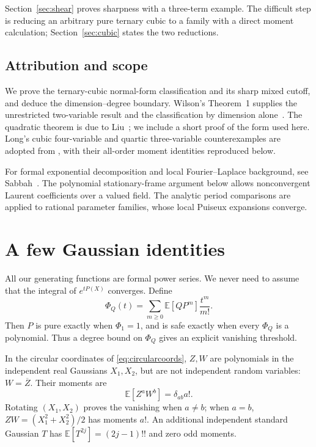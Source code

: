 \documentclass[11pt]{article}
\theoremstyle{definition}\newtheorem{definition}[theorem]{Definition}
\theoremstyle{remark}\newtheorem{remark}[theorem]{Remark}
\newcommand{\E}{\mathbb E}
\begin{document}
Section~\ref{sec:shear} proves sharpness with a three-term example.
The difficult step is reducing an arbitrary pure ternary cubic to a
family with a direct moment calculation; Section~\ref{sec:cubic}
states the two reductions.

\subsection*{Attribution and scope}
We prove the ternary-cubic normal-form classification and its sharp
mixed cutoff, and deduce the dimension--degree boundary. Wilson's
Theorem~1 supplies the unrestricted two-variable result and the
classification by dimension alone~\cite{Wilson}. The quadratic theorem
is due to Liu~\cite[Theorems~2.1 and~2.2]{Liu}; we include a short proof
of the form used here. Long's cubic four-variable and quartic
three-variable counterexamples are adopted from
\cite[Proposition~4.1 and Theorem~5.1]{Long}, with their all-order moment
identities reproduced below.

For formal exponential decomposition and local Fourier--Laplace
background, see Sabbah~\cite{SabbahStationary}. The polynomial
stationary-frame argument below allows nonconvergent Laurent coefficients
over a valued field. The analytic period comparisons are applied to
rational parameter families, whose local Puiseux expansions converge.

\section{A few Gaussian identities}

All our generating functions are formal power series. We never need to
assume that the integral of $e^{tP(X)}$ converges. Define
\begin{equation}\label{eq:phi}
 \Phi_Q(t)=\sum_{m\geq0}\E[QP^m]\frac{t^m}{m!}.
\end{equation}
Then $P$ is pure exactly when $\Phi_1=1$, and is safe exactly when
every $\Phi_Q$ is a polynomial. Thus a degree bound on $\Phi_Q$ gives
an explicit vanishing threshold.

In the circular coordinates of \eqref{eq:circularcoords}, $Z,W$ are
polynomials in the independent real Gaussians $X_1,X_2$, but are not
independent random variables: $W=\overline Z$. Their moments are
\begin{equation}\label{eq:wick}
 \E[Z^aW^b]=\delta_{ab}a!.
\end{equation}
Rotating $(X_1,X_2)$ proves the vanishing when $a\ne b$; when $a=b$,
$ZW=(X_1^2+X_2^2)/2$ has moments $a!$. An additional independent
standard Gaussian $T$ has $\E[T^{2j}]=(2j-1)!!$ and zero odd moments.
\end{document}
